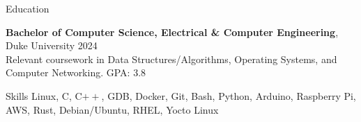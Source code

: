 \documentclass{resume}
\begin{document}






\begin{rSection}{Education}

\textbf{Bachelor of Computer Science, Electrical \& Computer Engineering}, Duke University \hfill {2024}\\
Relevant coursework in Data Structures/Algorithms, Operating Systems, and Computer Networking. \hfill {GPA: 3.8}


\end{rSection}

\begin{rSection}{Skills}
    Linux, C, C$++$, GDB, Docker, Git, Bash, Python, Arduino, Raspberry Pi, AWS, Rust, Debian/Ubuntu, RHEL, Yocto Linux
\end{rSection}

\end{document}
